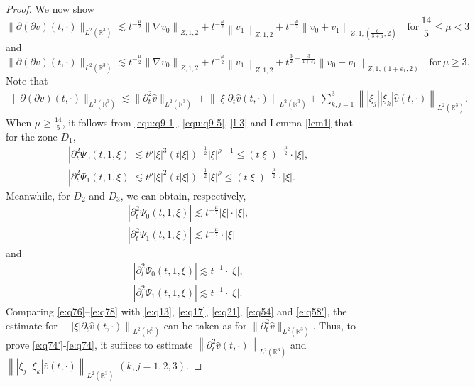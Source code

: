 \documentclass[11pt,twoside]{article}
\newcommand{\R}{\mathbb R}
\newcommand{\p}{\partial}
\newcommand{\f}{\frac}
\theoremstyle{plain}
\theoremstyle{definition}
\theoremstyle{remark}
\numberwithin{equation}{section}
\begin{document}
\begin{proof}
We now show
\begin{equation}\label{e:q74'}
\|\p(\p v)(t, \cdot)\|_{L^2(\R^3)} \lesssim t^{-\f{\mu}{2}}\left\|\nabla v_0\right\|_{Z, 1, 2}+t^{-\f{\mu}{2}}\left\| v_1\right\|_{Z, 1, 2}+t^{-\f{\mu}{2}}\left\|v_0+v_1\right\|_{Z, 1,(\f{6}{3+\mu},2)}\quad \text{for}\, \f{14}{5}\leq\mu<3
\end{equation}
and
\begin{equation}\label{e:q74}
\|\p(\p v)(t, \cdot)\|_{L^2(\R^3)}\lesssim t^{-\f{\mu}{2}}\left\|\nabla v_0\right\|_{Z, 1, 2}+t^{-\f{\mu}{2}}\left\| v_1\right\|_{Z, 1, 2}+t^{\f32-\f{3}{1+\varepsilon_1}}\left\|v_0+v_1\right\|_{Z, 1,(1+\varepsilon_1,2)} \quad \text{for}\, \mu\geq3.
\end{equation}
Note that
\begin{equation}\label{e:q75}
\begin{aligned}
\|\p(\p v)(t, \cdot)\|_{L^2(\R^3)} \lesssim \|\p_t^2\hat{v}\|_{L^2(\R^3)}+\left\||\xi|\p_t\hat{v}(t, \cdot)\right\|_{L^2(\R^3)}+ \sum_{k,j=1}^3\left\||\xi_j||\xi_k|\hat{v}(t, \cdot)\right\|_{L^2(\R^3)}.
\end{aligned}
\end{equation}
When $\mu \geq \f{14}{5}$, it follows from \eqref{equ:q9-1}, \eqref{equ:q9-5}, \eqref{l-3} and Lemma \ref{lem1} that for the zone $D_1$,
\begin{equation}\label{e:q76}
\begin{aligned}
& \left|\p_t^2\Psi_0(t, 1,\xi)\right| \lesssim t^\rho|\xi|^3(t|\xi|)^{-\f{1}{2}}|\xi|^{\rho-1}\leq (t|\xi|)^{-\frac{\mu}{2}}\cdot|\xi|, \\
& \left|\p_t^2\Psi_1(t, 1, \xi)\right|  \lesssim t^\rho|\xi|^2(t|\xi|)^{-\f{1}{2}}|\xi|^{\rho}\leq (t|\xi|)^{-\frac{\mu}{2}}\cdot|\xi|.
\end{aligned}
\end{equation}
Meanwhile, for $D_2$ and $D_3$, we can obtain, respectively,
\begin{equation}\label{e:q77}
\begin{aligned}
& \left|\p_t^2\Psi_0(t, 1,\xi)\right| \lesssim t^{-\frac{\mu}{2}}|\xi|\cdot|\xi|, \\
& \left|\p_t^2\Psi_1(t, 1, \xi)\right|  \lesssim t^{-\frac{\mu}{2}}\cdot|\xi|
\end{aligned}
\end{equation}
and
\begin{equation}\label{e:q78}
\begin{aligned}
& \left|\p_t^2\Psi_0(t, 1,\xi)\right| \lesssim t^{-1}\cdot|\xi|, \\
& \left|\p_t^2\Psi_1(t, 1, \xi)\right|  \lesssim t^{-1}\cdot|\xi|.
\end{aligned}
\end{equation}
Comparing   \eqref{e:q76}--\eqref{e:q78} with  \eqref{e:q13}, \eqref{e:q17}, \eqref{e:q21}, \eqref{e:q54} and \eqref{e:q58'}, the estimate for $\left\||\xi|\p_t\hat{v}(t, \cdot)\right\|_{L^2(\R^3)}$ can be taken as for $\|\p_t^2\hat{v}\|_{L^2(\R^3)}$. Thus, to prove  \eqref{e:q74'}-\eqref{e:q74}, it suffices  to estimate $\left\|\p_t^2\hat{v}(t, \cdot)\right\|_{L^2(\R^3)}$ and $\left\||\xi_j||\xi_k|\hat{v}(t, \cdot)\right\|_{L^2(\R^3)}$ $(k, j=1, 2, 3)$.


\end{proof}
\end{document}
